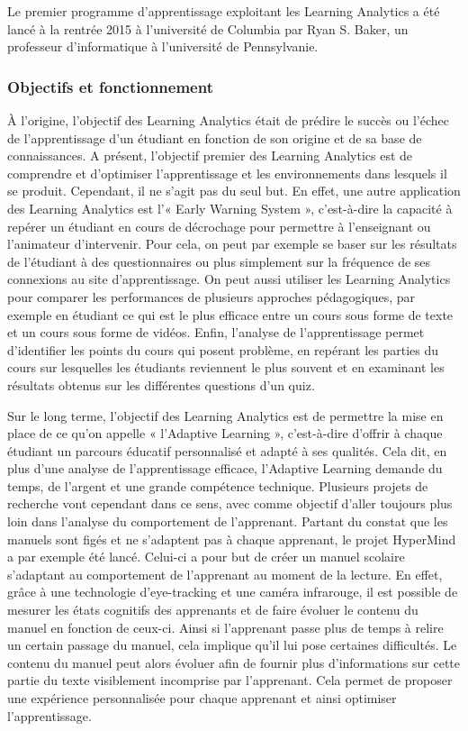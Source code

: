             Le premier programme d’apprentissage exploitant les Learning Analytics a été lancé à la rentrée 2015 à l’université de Columbia par Ryan S. Baker, un professeur d’informatique à l’université de Pennsylvanie.
       
       \subsubsection{Objectifs et fonctionnement}
    
           À l’origine, l’objectif des Learning Analytics était de prédire le succès ou l’échec de l’apprentissage d’un étudiant en fonction de son origine et de sa base de connaissances. A présent, l’objectif premier des Learning Analytics est de comprendre et d’optimiser l’apprentissage et les environnements dans lesquels il se produit. Cependant, il ne s’agit pas du seul but. En effet, une autre application des Learning Analytics est l’« Early Warning System », c’est-à-dire la capacité à repérer un étudiant en cours de décrochage pour permettre à l’enseignant ou l’animateur d’intervenir. Pour cela, on peut par exemple se baser sur les résultats de l’étudiant à des questionnaires ou plus simplement sur la fréquence de ses connexions au site d’apprentissage. On peut aussi utiliser les Learning Analytics pour comparer les performances de plusieurs approches pédagogiques, par exemple en étudiant ce qui est le plus efficace entre un cours sous forme de texte et un cours sous forme de vidéos. Enfin, l’analyse de l’apprentissage permet d’identifier les points du cours qui posent problème, en repérant les parties du cours sur lesquelles les étudiants reviennent le plus souvent et en examinant les résultats obtenus sur les différentes questions d’un quiz.
       
           Sur le long terme, l’objectif des Learning Analytics est de permettre la mise en place de ce qu’on appelle « l’Adaptive Learning », c’est-à-dire d’offrir à chaque étudiant un parcours éducatif personnalisé et adapté à ses qualités. Cela dit, en plus d’une analyse de l’apprentissage efficace, l’Adaptive Learning demande du temps, de l’argent et une grande compétence technique. Plusieurs projets de recherche vont cependant dans ce sens, avec comme objectif d’aller toujours plus loin dans l’analyse du comportement de l’apprenant. Partant du constat que les manuels sont figés et ne s’adaptent pas à chaque apprenant, le projet HyperMind a par exemple été lancé. Celui-ci a pour but de créer un manuel scolaire s’adaptant au comportement de l’apprenant au moment de la lecture. En effet, grâce à une technologie d'eye-tracking et une caméra infrarouge, il est possible de mesurer les états cognitifs des apprenants et de faire évoluer le contenu du manuel en fonction de ceux-ci. Ainsi si l’apprenant passe plus de temps à relire un certain passage du manuel, cela implique qu’il lui pose certaines difficultés. Le contenu du manuel peut alors évoluer afin de fournir plus d’informations sur cette partie du texte visiblement incomprise par l’apprenant. Cela permet de proposer une expérience personnalisée pour chaque apprenant et ainsi optimiser l’apprentissage.
       
